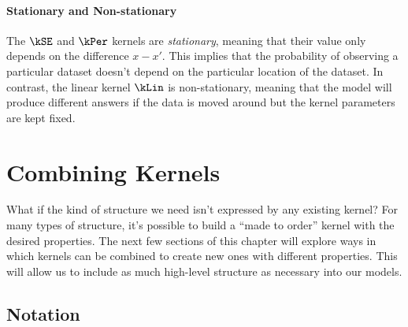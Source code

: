 \paragraph{Stationary and Non-stationary}
The $\kSE$ and $\kPer$ kernels are \emph{stationary}, meaning that their value only depends on the difference $x-x'$.  This implies that the probability of observing a particular dataset doesn't depend on the particular location of the dataset.
In contrast, the linear kernel $\kLin$ is non-stationary, meaning that the model will produce different answers if the data is moved around but the kernel parameters are kept fixed.




\section{Combining Kernels}

What if the kind of structure we need isn't expressed by any existing kernel?
For many types of structure, it's possible to build a ``made to order'' kernel with the desired properties.
The next few sections of this chapter will explore ways in which kernels can be combined to create new ones with different properties.
This will allow us to include as much high-level structure as necessary into our models.





\subsection{Notation}

